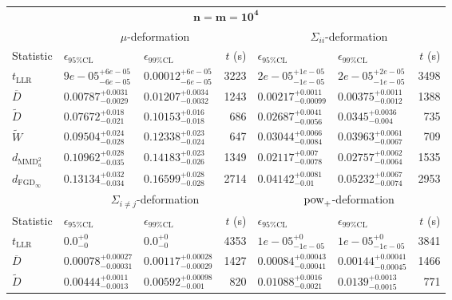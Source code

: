 \begin{tabular}{l|llr|llr}
	\toprule
	\multicolumn{7}{c}{$\mathbf{n=m=10^{4}}$} \\
	\multicolumn{1}{c}{} & \multicolumn{3}{c}{$\mu$-deformation} & \multicolumn{3}{c}{$\Sigma_{ii}$-deformation} \\
	Statistic & $\epsilon_{95\%\mathrm{CL}}$ & $\epsilon_{99\%\mathrm{CL}}$ & $t$ (s) & $\epsilon_{95\%\mathrm{CL}}$ & $\epsilon_{99\%\mathrm{CL}}$ & $t$ (s) \\
	\midrule
	$t_{\mathrm{LLR}}$ & $9e-05_{-6e-05}^{+6e-05}$ & $0.00012_{-6e-05}^{+6e-05}$ & 3223 & $2e-05_{-1e-05}^{+1e-05}$ & $2e-05_{-1e-05}^{+2e-05}$ & 3498 \\
	$\overline{D}$ & $0.00787_{-0.0029}^{+0.0031}$ & $0.01207_{-0.0032}^{+0.0034}$ & 1243 & $0.00217_{-0.00099}^{+0.0011}$ & $0.00375_{-0.0012}^{+0.0011}$ & 1388 \\
	$\widetilde{D}$ & $0.07672_{-0.021}^{+0.018}$ & $0.10153_{-0.018}^{+0.016}$ & 686 & $0.02687_{-0.0056}^{+0.0041}$ & $0.0345_{-0.004}^{+0.0036}$ & 735 \\
	$\widetilde{W}$ & $0.09504_{-0.028}^{+0.024}$ & $0.12338_{-0.024}^{+0.023}$ & 647 & $0.03044_{-0.0084}^{+0.0066}$ & $0.03963_{-0.0067}^{+0.0061}$ & 709 \\
	$d_{\mathrm{MMD}^{2}_{u}}$ & $0.10962_{-0.035}^{+0.028}$ & $0.14183_{-0.026}^{+0.023}$ & 1349 & $0.02117_{-0.0078}^{+0.007}$ & $0.02757_{-0.0064}^{+0.0062}$ & 1535 \\
	$d_{\mathrm{FGD}_{\infty}}$ & $0.13134_{-0.034}^{+0.032}$ & $0.16599_{-0.028}^{+0.028}$ & 2714 & $0.04142_{-0.01}^{+0.0081}$ & $0.05232_{-0.0074}^{+0.0067}$ & 2953 \\
	\toprule
	\multicolumn{1}{c}{} & \multicolumn{3}{c}{$\Sigma_{i\neq j}$-deformation} & \multicolumn{3}{c}{$\rm{pow}_{+}$-deformation} \\
	Statistic & $\epsilon_{95\%\mathrm{CL}}$ & $\epsilon_{99\%\mathrm{CL}}$ & $t$ (s) & $\epsilon_{95\%\mathrm{CL}}$ & $\epsilon_{99\%\mathrm{CL}}$ & $t$ (s) \\
	\midrule
	$t_{\mathrm{LLR}}$ & $0.0_{-0}^{+0}$ & $0.0_{-0}^{+0}$ & 4353 & $1e-05_{-1e-05}^{+0}$ & $1e-05_{-1e-05}^{+0}$ & 3841 \\
	$\overline{D}$ & $0.00078_{-0.00031}^{+0.00027}$ & $0.00117_{-0.00029}^{+0.00028}$ & 1427 & $0.00084_{-0.00041}^{+0.00043}$ & $0.00144_{-0.00045}^{+0.00041}$ & 1466 \\
	$\widetilde{D}$ & $0.00444_{-0.0013}^{+0.0011}$ & $0.00592_{-0.001}^{+0.00098}$ & 820 & $0.01088_{-0.0021}^{+0.0016}$ & $0.0139_{-0.0015}^{+0.0013}$ & 771 \\

\end{tabular}
